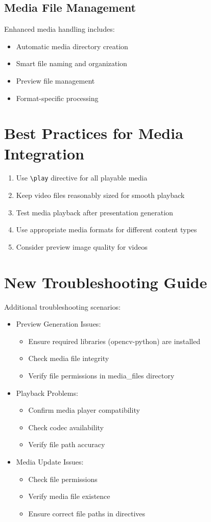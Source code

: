 \documentclass{article}
\begin{document}
\subsection{Media File Management}
Enhanced media handling includes:
\begin{itemize}
    \item Automatic media directory creation
    \item Smart file naming and organization
    \item Preview file management
    \item Format-specific processing
\end{itemize}

\section{Best Practices for Media Integration}
\begin{enumerate}
    \item Use \texttt{\textbackslash play} directive for all playable media
    \item Keep video files reasonably sized for smooth playback
    \item Test media playback after presentation generation
    \item Use appropriate media formats for different content types
    \item Consider preview image quality for videos
\end{enumerate}

\section{New Troubleshooting Guide}
Additional troubleshooting scenarios:
\begin{itemize}
    \item Preview Generation Issues:
        \begin{itemize}
            \item Ensure required libraries (opencv-python) are installed
            \item Check media file integrity
            \item Verify file permissions in media\_files directory
        \end{itemize}
    \item Playback Problems:
        \begin{itemize}
            \item Confirm media player compatibility
            \item Check codec availability
            \item Verify file path accuracy
        \end{itemize}
    \item Media Update Issues:
        \begin{itemize}
            \item Check file permissions
            \item Verify media file existence
            \item Ensure correct file paths in directives
        \end{itemize}
\end{itemize}
\end{document}
